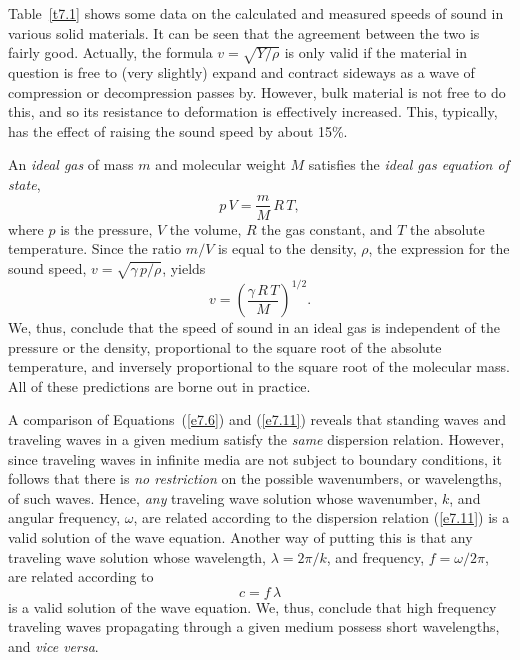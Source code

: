 Table~\ref{t7.1} shows some data on the
calculated and measured speeds of sound in various solid materials. It can
be seen that the agreement between the two is fairly good. Actually, the
formula $v=\sqrt{Y/\rho}$ is only valid if the material in question is free
to (very slightly) expand and contract sideways as a wave of compression or
decompression passes by. However, bulk material is not free to do this, and so its
resistance to deformation is effectively increased. This, typically,  has the effect of
raising the sound speed by about 15\%. 

An {\em ideal gas}\/ of mass $m$ and molecular weight $M$ satisfies the
{\em ideal gas equation  of state},
\begin{equation}
p\,V = \frac{m}{M}\,R\,T,
\end{equation}
where $p$ is the pressure, $V$ the volume, $R$ the gas constant, and $T$ the
absolute temperature. Since the ratio $m/V$ is equal to the density, $\rho$, the expression
for the sound speed, $v=\sqrt{\gamma\,p/\rho}$, yields
\begin{equation}
v = \left(\frac{\gamma\,R\,T}{M}\right)^{1/2}.
\end{equation}
We, thus, conclude that the speed of sound in an ideal gas is independent
of the pressure or the density, proportional to the square root of the absolute temperature, 
and inversely proportional to the square root of the molecular mass. All of these
predictions are borne out in practice. 

A comparison of Equations~(\ref{e7.6}) and (\ref{e7.11}) reveals that standing
waves and traveling waves in a given medium  satisfy the {\em same}\/ dispersion relation. However, since traveling waves in infinite media are not subject to boundary conditions, it follows that there is {\em no restriction}\/ on the possible wavenumbers, or wavelengths,
of such waves.  Hence, {\em any}\/ traveling wave solution whose wavenumber, $k$, and
angular frequency, $\omega$, are related according to the dispersion relation
(\ref{e7.11}) is a valid solution of the wave equation. Another way of putting this is that
any traveling wave solution whose wavelength, $\lambda=2\pi/k$, and frequency, $f=\omega/2\pi$, are related according to
\begin{equation}
c = f\,\lambda
\end{equation}
is a valid solution of the wave equation. We, thus, conclude that high frequency traveling waves propagating through a given medium possess
short wavelengths, and {\em vice versa}. 

